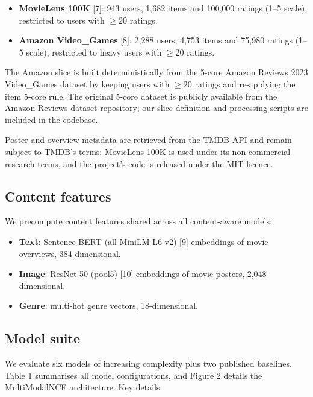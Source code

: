 \documentclass[11pt,a4paper]{article}
\begin{document}
\begin{itemize}[leftmargin=1.6em,itemsep=1pt,topsep=3pt]
  \item \textbf{MovieLens 100K} [7]: 943 users, 1,682 items and 100,000 ratings
        (1--5 scale), restricted to users with $\geq20$ ratings.
  \item \textbf{Amazon Video\_Games} [8]: 2,288 users, 4,753 items and 75,980
        ratings (1--5 scale), restricted to heavy users with $\geq20$ ratings.
\end{itemize}

The Amazon slice is built deterministically from the 5-core Amazon Reviews 2023
Video\_Games dataset by keeping users with $\geq20$ ratings and re-applying the
item 5-core rule. The original 5-core dataset is publicly available from the
Amazon Reviews dataset repository; our slice definition and processing scripts
are included in the codebase.

Poster and overview metadata are retrieved from the TMDB API and remain subject
to TMDB's terms; MovieLens 100K is used under its non-commercial research terms,
and the project's code is released under the MIT licence.

\subsection{Content features}
We precompute content features shared across all content-aware models:

\begin{itemize}[leftmargin=1.6em,itemsep=1pt,topsep=3pt]
  \item \textbf{Text}: Sentence-BERT (all-MiniLM-L6-v2) [9] embeddings of movie
        overviews, 384-dimensional.
  \item \textbf{Image}: ResNet-50 (pool5) [10] embeddings of movie posters,
        2,048-dimensional.
  \item \textbf{Genre}: multi-hot genre vectors, 18-dimensional.
\end{itemize}

\subsection{Model suite}
We evaluate six models of increasing complexity plus two published baselines.
Table 1 summarises all model configurations, and Figure 2 details the
MultiModalNCF architecture. Key details:
\end{document}
